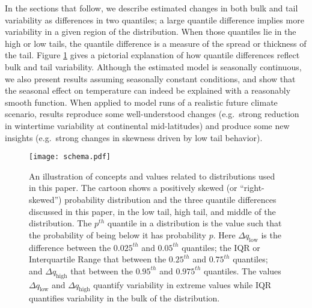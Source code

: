\documentclass{ametsoc}
\newcommand\smallfigwidth{\columnwidth}
\begin{document}
 In the sections that follow, we describe estimated changes in both bulk and tail variability as differences in two quantiles; a large quantile difference implies more variability in a given region of the distribution. 
When those quantiles lie in the high or low tails, the quantile difference is a measure of the spread or thickness of the tail.
 Figure \ref{schema} gives a pictorial explanation of how quantile differences reflect bulk and tail variability.
Although the estimated model is seasonally continuous, we also present results assuming seasonally constant conditions, and show that the seasonal effect on temperature can indeed be explained with a reasonably smooth function. When applied to model runs of a realistic future climate scenario, results reproduce some well-understood changes (e.g.\ strong reduction in wintertime variability at continental mid-latitudes) and produce some new insights (e.g.\ strong changes in skewness driven by low tail behavior). 


\begin{figure} 
\texttt{[image: schema.pdf]}
\caption{\small{An illustration of concepts and values related to distributions used in this paper. The cartoon shows a positively skewed (or ``right-skewed'') probability distribution and the three quantile differences discussed in this paper, in the low tail, high tail, and middle of the distribution. 
The $p^{th}$ quantile in a distribution is the value such that the probability of being below it has probability $p$. Here $\Delta q_{\text{low}}$ is the difference between the $0.025^{th}$ and $0.05^{th}$ quantiles; the IQR or Interquartile Range that between the $0.25^{th}$ and $0.75^{th}$ quantiles; and $\Delta q_{\text{high}}$ that between the $0.95^{th}$ and $0.975^{th}$ quantiles. The values $\Delta q_{\text{low}}$ and $\Delta q_\text{high}$ quantify variability in extreme values while IQR quantifies variability in the bulk of the distribution.
}}            %
\label{schema}          %
\end{figure}

\end{document}
